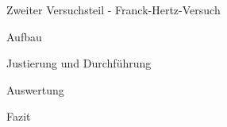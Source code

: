\documentclass[pdftex, a4paper,11pt, twoside, ngerman]{report}
\begin{document}
  \begin{chapter}{Zweiter Versuchsteil - Franck-Hertz-Versuch}
    \label{chp:Balmer}
 
 
    \begin{section}{Aufbau}
      \label{chp:Balmer:sec:Aufbau}
      
      
      
    \end{section}
   
   
   
    \begin{section}{Justierung und Durchführung}
      \label{chp:Balmer:sec:JusitierungDurchfuehrung}
     
     
    
    \end{section}


    

    \begin{section}{Auswertung}
      \label{chp:Balmer:sec:Auswertung}
      
      
     
    \end{section}
   
   
   
    \begin{section}{Fazit}
      \label{chp:Balmer:sec:Fazit}
      
      
      
    \end{section}
   
  \end{chapter}
  
  
  
  
  
  
  
  \begin{thebibliography}{99}
    \scriptsize
    
   
  \end{thebibliography}
 
\end{document}
